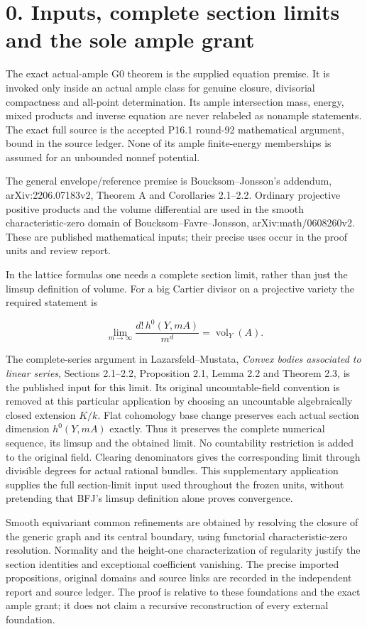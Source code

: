 \documentclass[
  10pt,
]{article}
\begin{document}
\section{0. Inputs, complete section limits and the sole ample
grant}\label{inputs-complete-section-limits-and-the-sole-ample-grant}

The exact actual-ample G0 theorem is the supplied equation premise. It
is invoked only inside an actual ample class for genuine closure,
divisorial compactness and all-point determination. Its ample
intersection mass, energy, mixed products and inverse equation are never
relabeled as nonample statements. The exact full source is the accepted
P16.1 round-92 mathematical argument, bound in the source ledger. None
of its ample finite-energy memberships is assumed for an unbounded
nonnef potential.

The general envelope/reference premise is Boucksom--Jonsson's addendum,
arXiv:2206.07183v2, Theorem A and Corollaries 2.1--2.2. Ordinary
projective positive products and the volume differential are used in the
smooth characteristic-zero domain of Boucksom--Favre--Jonsson,
arXiv:math/0608260v2. These are published mathematical inputs; their
precise uses occur in the proof units and review report.

In the lattice formulas one needs a complete section limit, rather than
just the limsup definition of volume. For a big Cartier divisor on a
projective variety the required statement is

\[\lim_{m\to\infty}\frac{d!\,h^0(Y,mA)}{m^d}=\operatorname{vol}_Y(A).\]

The complete-series argument in Lazarsfeld--Mustata, \emph{Convex bodies
associated to linear series}, Sections 2.1--2.2, Proposition 2.1, Lemma
2.2 and Theorem 2.3, is the published input for this limit. Its original
uncountable-field convention is removed at this particular application
by choosing an uncountable algebraically closed extension \(K/k\). Flat
cohomology base change preserves each actual section dimension
\(h^0(Y,mA)\) exactly. Thus it preserves the complete numerical
sequence, its limsup and the obtained limit. No countability restriction
is added to the original field. Clearing denominators gives the
corresponding limit through divisible degrees for actual rational
bundles. This supplementary application supplies the full section-limit
input used throughout the frozen units, without pretending that BFJ's
limsup definition alone proves convergence.

Smooth equivariant common refinements are obtained by resolving the
closure of the generic graph and its central boundary, using functorial
characteristic-zero resolution. Normality and the height-one
characterization of regularity justify the section identities and
exceptional coefficient vanishing. The precise imported propositions,
original domains and source links are recorded in the independent report
and source ledger. The proof is relative to these foundations and the
exact ample grant; it does not claim a recursive reconstruction of every
external foundation.
\end{document}
